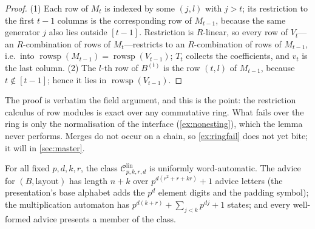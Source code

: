 \documentclass[a4paper,UKenglish,autoref,anonymous]{lipics-v2021}
\newcommand{\R}{R}                                   %
\newcommand{\rs}{\operatorname{rowsp}}
\newcommand{\lin}[1]{\mathcal{C}^{\mathrm{lin}}_{#1}}
\begin{document}
\begin{proof}
(1) Each row of $M_t$ is indexed by some $(j, l)$ with $j > t$; its
restriction to the first $t-1$ columns is the corresponding row of
$M_{t-1}$, because the same generator $j$ also lies outside $[t-1]$.
Restriction is $\R$-linear, so every row of $V_t$---an $\R$-combination
of rows of $M_t$---restricts to an $\R$-combination of rows of
$M_{t-1}$, i.e.\ into $\rs(M_{t-1}) = \rs(V_{t-1})$; $T_t$ collects the
coefficients, and $v_t$ is the last column. (2) The $l$-th row of
$B^{(t)}$ is the row $(t, l)$ of $M_{t-1}$, because $t \notin [t-1]$;
hence it lies in $\rs(V_{t-1})$.
\end{proof}

The proof is verbatim the field argument, and this is the point: the
restriction calculus of row modules is exact over any commutative ring.
What fails over the ring is only the normalisation of the interface
(\autoref{ex:nonesting}), which the lemma never performs. Merges do not
occur on a chain, so \autoref{ex:ringfail} does not yet bite; it will in
\autoref{sec:master}.

\begin{theorem}
\label{thm:word}
For all fixed $p, d, k, r$, the class $\lin{p,k,r,d}$ is uniformly
word-automatic. The advice for $(B, \text{layout})$ has length $n + k$
over $p^{d(r^2 + r + kr)} + 1$ advice letters (the presentation's base
alphabet adds the $p^d$ element digits and the padding symbol); the
multiplication automaton has $p^{d(k+r)} + \sum_{j<k} p^{dj} + 1$
states; and every well-formed advice presents a member of the class.
\end{theorem}
\end{document}
